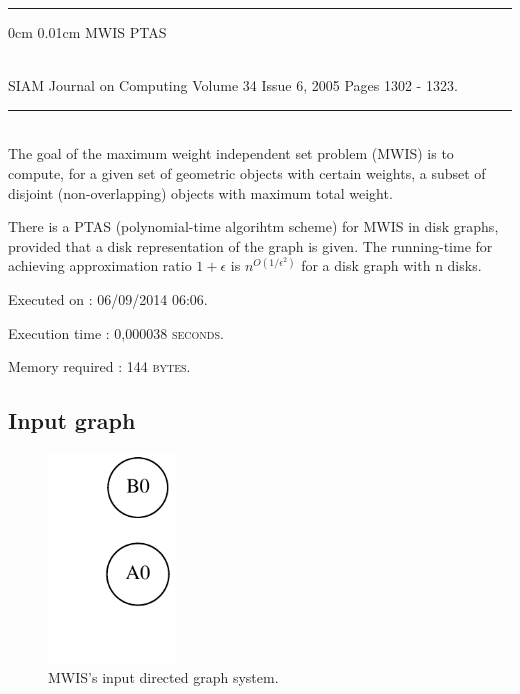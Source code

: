 \documentclass{article}
\makeatletter
\newcommand{\HRule}{\noindent\rule{\linewidth}{0.5mm}}
\renewcommand\section{\@startsection
  {section}{1}{0mm}%
  {0cm}%
  {0.01cm}%
  {\Huge\bfseries\color{black}}}%
\makeatother
\begin{document}
\HRule

\section{MWIS PTAS}

 \\[0.4cm]
{\LARGE SIAM Journal on Computing Volume 34 Issue 6, 2005 Pages 1302 - 1323.}\\[0.4cm]
\HRule \\[0.5cm]
\indent The goal of the maximum weight independent set problem (MWIS) is to compute, for a given set of geometric objects with certain weights, a subset of disjoint (non-overlapping) objects with maximum total weight.

There is a PTAS (polynomial-time algorihtm scheme) for MWIS in disk graphs, provided that a disk representation of the graph is given. 
The running-time for achieving approximation ratio $1+\epsilon$ 
is $n^{O(1/\epsilon^{2})}$ for a disk graph with n disks.\\[0.5cm]
\begin{compactitem}
\item Executed on : \textsc{06/09/2014 06:06}. 
\item Execution time : \textsc{0,000038 seconds}. 
\item Memory required : \textsc{144 bytes}. 
\end{compactitem}

\subsection{Input graph}
\begin{figure}[H]\centering
\noindent\includegraphics[height=210px]{reports/graph.pdf}
\caption{MWIS's input directed graph system.}
\end{figure}
\end{document}
